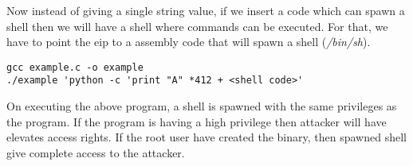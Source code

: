 \documentclass[a4paper, 11pt]{article} %
\begin{document}
	Now instead of giving a single string value, if we insert a code which can spawn a shell then we will have a shell where commands can be executed. For that, we have to point the eip to  a assembly code that will spawn a shell (\textit{/bin/sh}).
	
\begin{verbatim}
gcc example.c -o example
./example 'python -c 'print "A" *412 + <shell code>'
\end{verbatim}


	On executing the above program, a shell is spawned with the same privileges as the program. If the program is having a high privilege then attacker will have elevates access rights. If the root user have created the binary, then spawned shell give complete access to the attacker.










%

%

\end{document}
